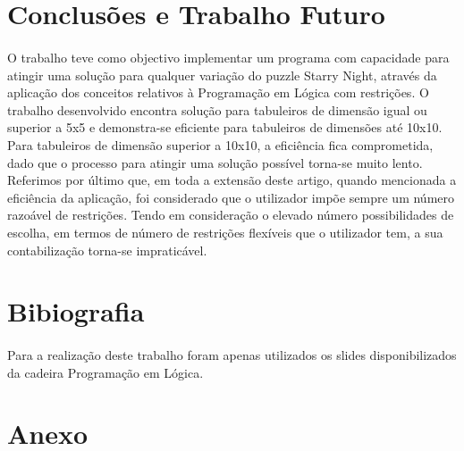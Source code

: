 \documentclass[a4paper]{article}
\begin{document}
\section{Conclusões e Trabalho Futuro}

\paragraph{}
O trabalho teve como objectivo implementar um programa com capacidade para atingir uma solução para qualquer variação do puzzle Starry Night, através da aplicação dos conceitos relativos à Programação em Lógica com restrições.
O trabalho desenvolvido encontra solução para tabuleiros de dimensão igual ou superior a 5x5 e demonstra-se eficiente para tabuleiros de dimensões até 10x10. Para tabuleiros de dimensão superior a 10x10, a eficiência fica comprometida, dado que o processo para atingir uma solução possível torna-se muito lento.
Referimos por último que, em toda a extensão deste artigo, quando mencionada a eficiência da aplicação, foi considerado que o utilizador impõe sempre um número razoável de restrições. Tendo em consideração o elevado número possibilidades de escolha, em termos de número de restrições flexíveis que o utilizador tem, a sua contabilização torna-se impraticável.

\section{Bibiografia}

\paragraph{}
Para a realização deste trabalho foram apenas utilizados os slides disponibilizados da cadeira Programação em Lógica. 

\section{Anexo}
\end{document}
